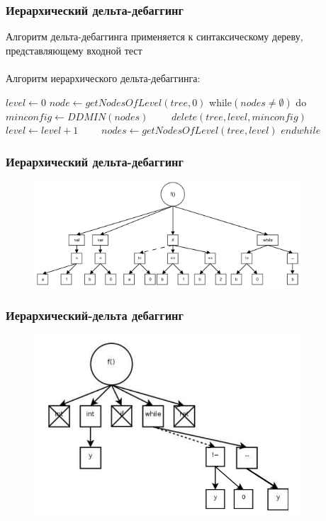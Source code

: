 
\begin{frame}
	\frametitle{Иерархический дельта-дебаггинг}
	Алгоритм дельта-дебаггинга применяется к синтаксическому дереву, представляющему входной тест \\ \ \\
	Алгоритм иерархического дельта-дебаггинга:
	\begin{algorithmic}
		\State $level \gets 0$
		\State $node \gets getNodesOfLevel(tree, 0)$
		\State while$(nodes \neq \emptyset)$ do
		\State \ \ \ \ $minconfig \gets DDMIN(nodes)$
		\State \ \ \ \ $delete(tree, level, minconfig)$
		\State \ \ \ \ $level \gets level + 1$
		\State \ \ \ \ $nodes \gets getNodesOfLevel(tree, level)$
		\State $end while$
		
	\end{algorithmic}
\end{frame}



\begin{frame}
	\frametitle{Иерархический дельта-дебаггинг}
	\begin{figure}
		\includegraphics[width=100mm]{image/hddexample}
	\end{figure}	
\end{frame}


\begin{frame}
	\frametitle{Иерархический-дельта дебаггинг}
	\begin{figure}
		\includegraphics[width=100mm]{image/hdd}
	\end{figure}	
\end{frame}

